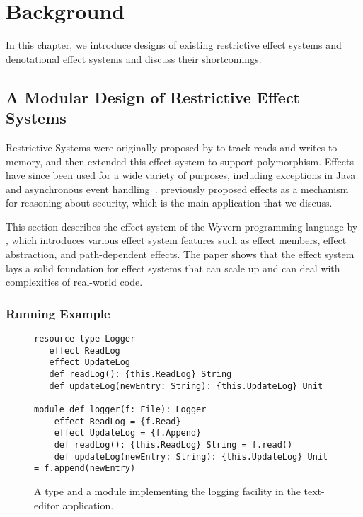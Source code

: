 

\chapter{Background}

In this chapter, we introduce designs of existing restrictive effect systems and denotational effect systems and discuss their shortcomings.

\label{chapter-background}
\section{A Modular Design of Restrictive Effect Systems}

\label{sec:wyvern-effects-basics}


Restrictive Systems were originally proposed by \citet{lucassen87} to track reads and writes to memory, and then \citet{lucassen88} extended this effect system to support polymorphism.  Effects have since been used for a wide variety of purposes, including exceptions in Java~\cite{kiniry06} and asynchronous event handling~\cite{bracevac18}. \citet{turbak08} previously proposed effects as a mechanism for reasoning about security, which is the main application that we discuss.

This section describes the effect system of the Wyvern programming language by \citet{melicher20}, which introduces various effect system features such as effect members, effect abstraction, and path-dependent effects. The paper shows that the effect system lays a solid foundation for effect systems that can scale up and can deal with complexities of real-world code.



\subsection{Running Example}
\begin{figure}[t]
\begin{lstlisting}[language=wyvern]  
resource type Logger
   effect ReadLog
   effect UpdateLog
   def readLog(): {this.ReadLog} String
   def updateLog(newEntry: String): {this.UpdateLog} Unit

module def logger(f: File): Logger
	effect ReadLog = {f.Read}
	effect UpdateLog = {f.Append}
	def readLog(): {this.ReadLog} String = f.read()
	def updateLog(newEntry: String): {this.UpdateLog} Unit = f.append(newEntry)
\end{lstlisting}
\caption{A type and a module implementing the logging facility in the text-editor application.}
\label{f-logger}
\end{figure}

